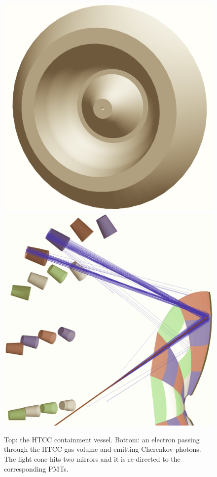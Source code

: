 \begin{figure}
	\centering
	\includegraphics[width=0.99\columnwidth,keepaspectratio]{img/htccGeometry.png}
	\includegraphics[width=0.99\columnwidth,keepaspectratio]{img/htccDetail.png}
	\caption{Top: the HTCC containment vessel. Bottom: an electron passing through the HTCC gas volume and emitting Cherenkov photons.
	         The light cone hits two mirrors and it is re-directed to the corresponding PMTs.}
	\label{fig:htccGeometry}
\end{figure}

